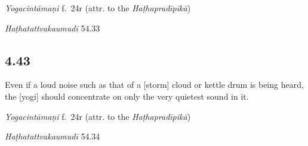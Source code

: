\begin{ekdosis}
\begin{testimonia}[hp04_042]
\emph{Yogacintāmaṇi} f.~24r (attr. to the \emph{Haṭhapradīpikā})
\begin{versinnote}
\end{versinnote}

\emph{Haṭhatattvakaumudī} 54.33
\begin{versinnote}
\end{versinnote}
\end{testimonia}


\subsection*{4.43}
\begin{translation}[hp04_043]
Even if a loud noise such as that of a [storm] cloud or kettle drum is being heard, the [yogi] should concentrate on only the very quietest sound in it.
\end{translation}


\begin{testimonia}[hp04_043]
\emph{Yogacintāmaṇi} f.~24r (attr. to the \emph{Haṭhapradīpikā})
\begin{versinnote}
\end{versinnote}

\emph{Haṭhatattvakaumudī} 54.34
\begin{versinnote}
\end{versinnote}
\end{testimonia}


\end{ekdosis}
